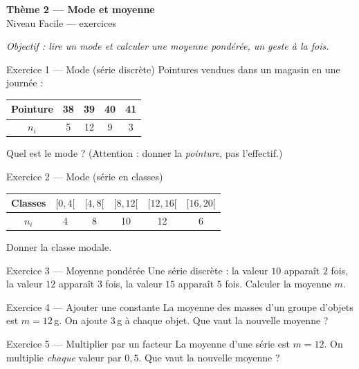 \documentclass[11pt,a4paper]{article}
\newcommand{\bandeau}[2]{%
\begin{tcolorbox}[boxbase,colback=primary,colframe=primarydark,halign=center,
   before skip=2pt,after skip=12pt]
{\LARGE\bfseries\color{white} #1}\\[3pt]{\normalsize\color{white} #2}
\end{tcolorbox}}
\begin{document}
\bandeau{Thème 2 — Mode et moyenne}{Niveau Facile — exercices}

\noindent\textit{Objectif : lire un mode et calculer une moyenne pondérée, un geste à la fois.}\medskip

\begin{exobox}{Exercice 1 — Mode (série discrète)}
Pointures vendues dans un magasin en une journée :
\begin{center}
\begin{tabular}{|c|c|c|c|c|}
\hline
Pointure & 38 & 39 & 40 & 41 \\\hline
$n_i$ & 5 & 12 & 9 & 3 \\\hline
\end{tabular}
\end{center}
Quel est le mode ? (Attention : donner la \emph{pointure}, pas l'effectif.)
\end{exobox}

\begin{exobox}{Exercice 2 — Mode (série en classes)}
\begin{center}
\begin{tabular}{|c|c|c|c|c|c|}
\hline
Classes & $[0,4[$ & $[4,8[$ & $[8,12[$ & $[12,16[$ & $[16,20[$ \\\hline
$n_i$ & 4 & 8 & 10 & 12 & 6 \\\hline
\end{tabular}
\end{center}
Donner la classe modale.
\end{exobox}

\begin{exobox}{Exercice 3 — Moyenne pondérée}
Une série discrète : la valeur $10$ apparaît $2$ fois, la valeur $12$ apparaît $3$ fois, la valeur
$15$ apparaît $5$ fois. Calculer la moyenne $m$.
\end{exobox}

\begin{exobox}{Exercice 4 — Ajouter une constante}
La moyenne des masses d'un groupe d'objets est $m=12$\,g. On ajoute $3$\,g à chaque objet.
Que vaut la nouvelle moyenne ?
\end{exobox}

\begin{exobox}{Exercice 5 — Multiplier par un facteur}
La moyenne d'une série est $m=12$. On multiplie \emph{chaque} valeur par $0{,}5$.
Que vaut la nouvelle moyenne ?
\end{exobox}
\end{document}
